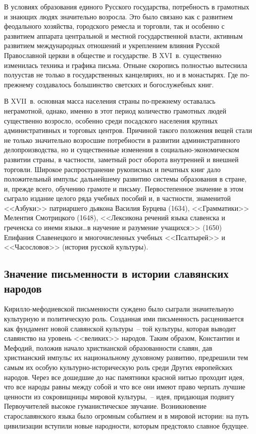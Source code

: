   В условиях образования единого Русского государства, потребность в грамотных
  и знающих людях значительно возросла. Это было связано как с развитием
  феодального хозяйства, городского ремесла и торговли, так и особенно с
  развитием аппарата центральной и местной государственной власти, активным
  развитием международных отношений и укреплением влияния Русской Православной
  церкви в обществе и государстве. В XVI~в. существенно изменилась техника и
  графика письма. Отныне скоропись полностью вытеснила полуустав не только в
  государственных канцеляриях, но и в монастырях. Где по-прежнему создавалось
  большинство светских и богослужебных книг.
  
  В XVII~в. основная масса населения страны по-прежнему оставалась неграмотной,
  однако, именно в этот период количество грамотных людей существенно возросло,
  особенно среди посадского населения крупных административных и торговых
  центров. Причиной такого положения вещей стали не только значительно
  возросшие потребности в развитии административного делопроизводства, но и
  существенные изменения в социально-экономическом развитии страны, в
  частности, заметный рост оборота внутренней и внешней торговли. Широкое
  распространение рукописных и печатных книг дало положительный импульс
  дальнейшему развитию системы образования в стране, и, прежде всего, обучению
  грамоте и письму. Первостепенное значение в этом сыграло издание целого ряда
  учебных пособий и, в частности, знаменитой <<Азбуки>> патриаршего дьякона
  Василия Бурцева (1634), <<Грамматики>> Мелентия Смотрицкого (1648),
  <<Лексикона речений языка славенска и греченска со инеми языки\ldots в научение
  и разумение учащихся>> (1650) Епифания Славенецкого и многочисленных учебных
  <<Псалтырей>> и <<Часословов>> (история русской культуры).
  
  \subsection{Значение письменности в истории славянских народов}
  
  Кирилло-мефодиевской письменности суждено было сыграли значительную
  культурную и политическую роль. Созданная ими письменность расценивается как
  фундамент новой славянской культуры~-- той культуры, которая выводит
  славянство на уровень <<великих>> народов. Таким образом, Константин и
  Мефодий, положив начало христианской образованности славян, дав христианский
  импульс их национальному духовному развитию, предрешили тем самым их особую
  культурно-историческую роль среди Других европейских народов. Через все
  дошедшие до нас памятники красной нитью проходит идея, что все народы равны
  между собой и что все они имеют право черпать лучшие ценности из сокровищницы
  мировой культуры,~-- идея, придающая подвигу Первоучителей высокое
  гуманистическое звучание. Возникновение старославянского языка было огромным
  событием и в мировой истории: на путь цивилизации вступили новые народности,
  которым предстояло славное будущее.
  
